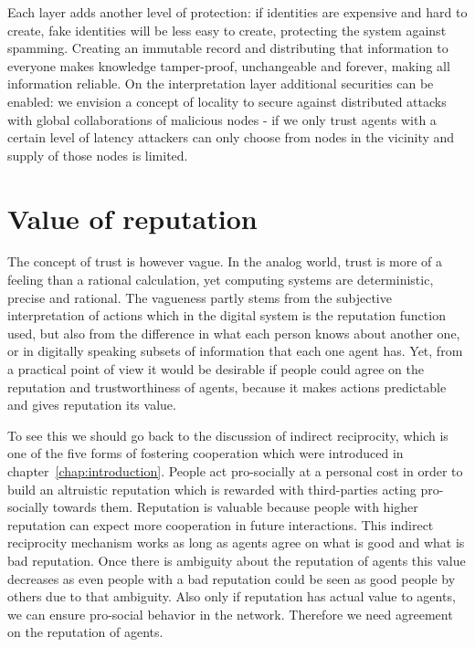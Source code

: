 Each layer adds another level of protection: if identities are expensive and hard to create, fake 
identities will be less easy to create, protecting the system against spamming. Creating an immutable
record and distributing that information to everyone makes knowledge tamper-proof, unchangeable and 
forever, making all information reliable. On the interpretation layer additional securities can be 
enabled: we envision a concept of locality to secure against distributed attacks with global 
collaborations of malicious nodes - if we only trust agents with a certain level of latency 
attackers can only choose from nodes in the vicinity and supply of those nodes is limited. 

\section{Value of reputation}
The concept of trust is however vague. In the analog world, trust is more of a feeling than a 
rational calculation, yet computing systems are deterministic, precise and rational. The vagueness 
partly stems from the subjective interpretation of actions which in the digital system is the 
reputation function used, but also from the difference in what each person knows about another one,
or in digitally speaking subsets of information that each one agent has. 
Yet, from a practical point of view it would be desirable if people could agree on the reputation 
and trustworthiness of agents, because it makes actions predictable and gives reputation its value. 

To see this we should go back to the discussion of indirect reciprocity, which is one of the five
forms of fostering cooperation which were introduced in chapter~\ref{chap:introduction}. People act
pro-socially at a personal cost in order to build an altruistic reputation which is rewarded with 
third-parties acting pro-socially towards them. Reputation is valuable because people with higher 
reputation can expect more cooperation in future interactions. This indirect reciprocity mechanism 
works as long as agents agree on what is good and what is bad reputation. Once there is ambiguity 
about the reputation of agents this value decreases as even people with a bad reputation could be 
seen as good people by others due to that ambiguity. Also only if reputation has actual value to 
agents, we can ensure pro-social behavior in the network. Therefore we need agreement on the 
reputation of agents. 

